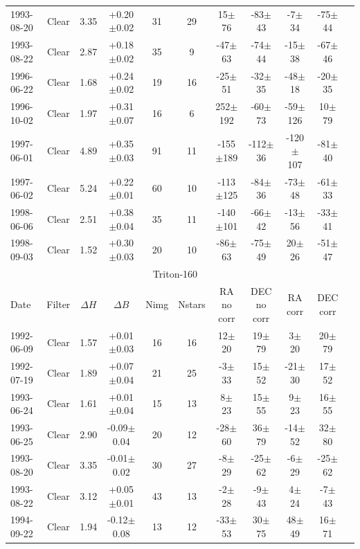 \documentclass[12pt,a4paper]{report}
\begin{document}
\begin{landscape}
\begin{longtable}{|l|c|c|c|c|c|c|c|c|c|c|}
1993-08-20 & Clear & 3.35 & +0.20$\pm$0.02 &  31 &  29 &   15$\pm$ 76 &  -83$\pm$ 43 &   -7$\pm$ 34 &  -75$\pm$ 44 \\ 
1993-08-22 & Clear & 2.87 & +0.18$\pm$0.02 &  35 &   9 &  -47$\pm$ 63 &  -74$\pm$ 44 &  -15$\pm$ 38 &  -67$\pm$ 46 \\ 
1996-06-22 & Clear & 1.68 & +0.24$\pm$0.02 &  19 &  16 &  -25$\pm$ 51 &  -32$\pm$ 35 &  -48$\pm$ 18 &  -20$\pm$ 35 \\ 
1996-10-02 & Clear & 1.97 & +0.31$\pm$0.07 &  16 &   6 &  252$\pm$192 &  -60$\pm$ 73 &  -59$\pm$126 &   10$\pm$ 79 \\ 
1997-06-01 & Clear & 4.89 & +0.35$\pm$0.03 &  91 &  11 & -155$\pm$189 & -112$\pm$ 36 & -120$\pm$107 &  -81$\pm$ 40 \\ 
1997-06-02 & Clear & 5.24 & +0.22$\pm$0.01 &  60 &  10 & -113$\pm$125 &  -84$\pm$ 36 &  -73$\pm$ 48 &  -61$\pm$ 33 \\ 
1998-06-06 & Clear & 2.51 & +0.38$\pm$0.04 &  35 &  11 & -140$\pm$101 &  -66$\pm$ 42 &  -13$\pm$ 56 &  -33$\pm$ 41 \\ 
1998-09-03 & Clear & 1.52 & +0.30$\pm$0.03 &  20 &  10 &  -86$\pm$ 63 &  -75$\pm$ 49 &   20$\pm$ 26 &  -51$\pm$ 47 \\ 
\hline
\multicolumn{10}{|c|}{Triton-160}\\
Date & Filter & $\Delta H$ & $\Delta B$ & Nimg & Nstars & RA no corr & DEC no corr & RA corr & DEC corr \\
\hline
1992-06-09 & Clear & 1.57 & +0.01$\pm$0.03 &  16 &  16 &   12$\pm$ 20 &   19$\pm$ 79 &    3$\pm$ 20 &   20$\pm$ 79 \\ 
1992-07-19 & Clear & 1.89 & +0.07$\pm$0.04 &  21 &  25 &   -3$\pm$ 33 &   15$\pm$ 52 &  -21$\pm$ 30 &   17$\pm$ 52 \\ 
1993-06-24 & Clear & 1.61 & +0.01$\pm$0.04 &  15 &  13 &    8$\pm$ 23 &   15$\pm$ 55 &    9$\pm$ 23 &   16$\pm$ 55 \\ 
1993-06-25 & Clear & 2.90 & -0.09$\pm$0.04 &  20 &  12 &  -28$\pm$ 60 &   36$\pm$ 79 &  -14$\pm$ 52 &   32$\pm$ 80 \\ 
1993-08-20 & Clear & 3.35 & -0.01$\pm$0.02 &  30 &  27 &   -8$\pm$ 29 &  -25$\pm$ 62 &   -6$\pm$ 29 &  -25$\pm$ 62 \\ 
1993-08-22 & Clear & 3.12 & +0.05$\pm$0.01 &  43 &  13 &   -2$\pm$ 28 &   -9$\pm$ 43 &    4$\pm$ 24 &   -7$\pm$ 43 \\ 
1994-09-22 & Clear & 1.94 & -0.12$\pm$0.08 &  13 &  12 &  -33$\pm$ 53 &   30$\pm$ 75 &   48$\pm$ 49 &   16$\pm$ 71 \\ 

\end{longtable}
\end{landscape}
\end{document}
